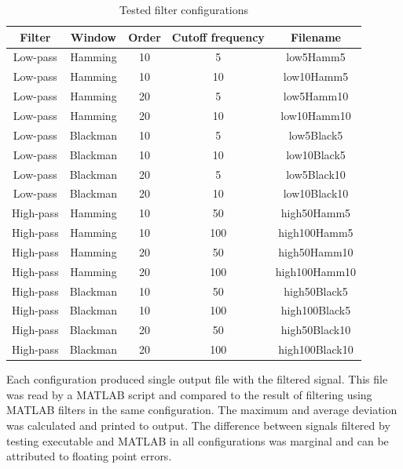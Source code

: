 \begin{table}[!h]
	\centering
	\label{t:filterCfg}
	\begin{tabular}{|c|c|c|c|c|}	
		\hline Filter & Window & Order & Cutoff frequency & Filename \\ 
		\hline Low-pass & Hamming & 10 & 5 & low5Hamm5 \\ 
		\hline Low-pass & Hamming & 10 & 10 & low10Hamm5 \\ 
		\hline Low-pass & Hamming & 20 & 5 & low5Hamm10 \\ 
		\hline Low-pass & Hamming & 20 & 10 & low10Hamm10 \\ 
		\hline Low-pass & Blackman & 10 & 5 & low5Black5 \\ 
		\hline Low-pass & Blackman & 10 & 10 & low10Black5 \\ 
		\hline Low-pass & Blackman & 20 & 5 & low5Black10 \\ 
		\hline Low-pass & Blackman & 20 & 10 & low10Black10 \\ 
		\hline High-pass & Hamming & 10 & 50 & high50Hamm5 \\ 
		\hline High-pass & Hamming & 10 & 100 & high100Hamm5 \\ 
		\hline High-pass & Hamming & 20 & 50 & high50Hamm10 \\ 
		\hline High-pass & Hamming & 20 & 100 & high100Hamm10 \\ 
		\hline High-pass & Blackman & 10 & 50 & high50Black5 \\ 
		\hline High-pass & Blackman & 10 & 100 & high100Black5 \\ 
		\hline High-pass & Blackman & 20 & 50 & high50Black10 \\ 
		\hline High-pass & Blackman & 20 & 100 & high100Black10 \\ 
		\hline 
	\end{tabular}
	\caption{Tested filter configurations}
\end{table}

Each configuration produced single output file with the filtered signal. This file was read by a MATLAB script and compared to the result of filtering using MATLAB filters in the same configuration. The maximum and average deviation was calculated and printed to output. The difference between signals filtered by testing executable and MATLAB in all configurations was marginal and can be attributed to floating point errors.

